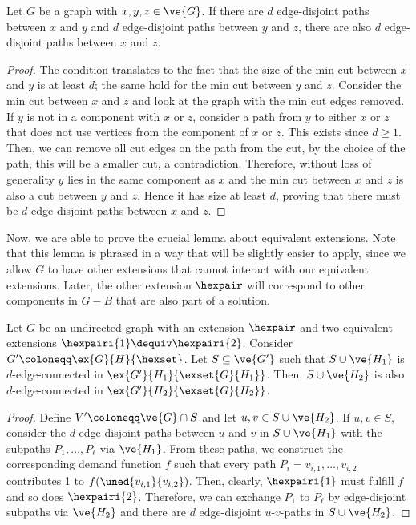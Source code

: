 \begin{lemma}
\begin{lemma}
\begin{lemma}
\iflong
\begin{lemma}
\else
\begin{lemma}[$\star$]
\fi
\label{lem:connect_paths}
  Let $G$ be a graph with $x,y,z \in \ve{G}$. If there are $d$ edge-disjoint paths between $x$ and $y$ and $d$ edge-disjoint paths between $y$ and $z$, there are also $d$ edge-disjoint paths between $x$ and $z$.
\end{lemma} 
\iflong
\begin{proof}
  The condition translates to the fact that the size of the min cut between $x$ and $y$ is at least $d$; the same hold for the min cut between $y$ and $z$. Consider the min cut between $x$ and $z$ and look at the graph with the min cut edges removed. If $y$ is not in a component with $x$ or $z$, consider a path from $y$ to either $x$ or $z$ that does not use vertices from the component of $x$ or $z$. This exists since $d \ge 1$. Then, we can remove all cut edges on the path from the cut, by the choice of the path, this will be a smaller cut, a contradiction. Therefore, without loss of generality $y$ lies in the same component as $x$ and the min cut between $x$ and $z$ is also a cut between $y$ and $z$. Hence it has size at least $d$, proving that there must be $d$ edge-disjoint paths between $x$ and $z$.
\end{proof}
\fi

Now, we are able to prove the crucial lemma about equivalent extensions. Note that this lemma is phrased in a way that will be slightly easier to apply, since we allow $G$ to have other extensions that cannot interact with our equivalent extensions. Later, the other extension $\hexpair$ will correspond to other components in $G-B$ that are also part of a solution.

\iflong
\begin{lemma}
\else
\begin{lemma}[$\star$]
\fi
\label{lem:equiv_d_edge}
  Let $G$ be an undirected graph with an extension $\hexpair$ and two equivalent extensions $\hexpairi{1} \dequiv \hexpairi{2}$. Consider $G' \coloneqq \ex{G}{H}{\hexset}$. Let $S \subseteq \ve{G'}$ such that $S \cup \ve{H_1}$ is $d$-edge-connected in $\ex{G'}{H_1}{\exset{G}{H_1}}$. Then, $S \cup \ve{H_2}$ is also $d$-edge-connected in $\ex{G'}{H_2}{\exset{G}{H_2}}$.
\end{lemma}
\iflong
\begin{proof}
  Define $V' \coloneqq \ve{G} \cap S$ and let $u, v \in S \cup \ve{H_2}$.
  If $u, v \in S$, consider the $d$ edge-disjoint paths between $u$ and $v$ in $S \cup \ve{H_1}$ with the subpaths $P_1, \ldots, P_{\ell}$ via $\ve{H_1}$. From these paths, we construct the corresponding demand function $f$ such that every path $P_i = v_{i,1}, \ldots, v_{i,2}$ contributes 1 to $f(\uned{v_{i,1}}{v_{i,2}})$. Then, clearly, $\hexpairi{1}$ must fulfill $f$ and so does $\hexpairi{2}$. Therefore, we can exchange $P_1$ to $P_{\ell}$ by edge-disjoint subpaths via $\ve{H_2}$ and there are $d$ edge-disjoint $u$-$v$-paths in $S \cup \ve{H_2}$.


\end{proof}
\end{lemma}
\end{lemma}
\end{lemma}
\end{lemma}
\end{lemma}
